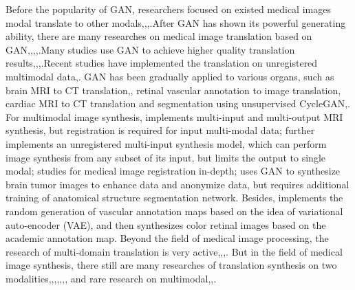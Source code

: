 \documentclass[letterpaper]{article} %
\begin{document}
Before the popularity of GAN, researchers focused on existed medical images modal translate to other modals\cite{22burgos2015robust},\cite{33huang2017simultaneous},\cite{34vemulapalli2015unsupervised},\cite{36vannguyen2015crossdomain}.After GAN has shown its powerful generating ability, there are many researches on medical image translation based on GAN\cite{2zhang2018translating},\cite{20nie2017medical},\cite{35osokin2017gans},\cite{36vannguyen2015crossdomain},\cite{40kamnitsas2017unsupervised}.Many studies use GAN to achieve higher quality translation results\cite{1zhao2018modular},\cite{5liang2018generative},\cite{6zhu2017unpaired},\cite{13choi2018stargan:}.Recent studies have implemented the translation on unregistered multimodal data\cite{2zhang2018translating},\cite{85joyce2017robust}.
GAN has been gradually applied to various organs, such as brain MRI to CT translation\cite{20nie2017medical},\cite{40kamnitsas2017unsupervised}, retinal vascular annotation to image translation\cite{41costa2017towards}, cardiac MRI to CT translation and segmentation using unsupervised CycleGAN\cite{6zhu2017unpaired},\cite{20nie2017medical}.
For multimodal image synthesis, \cite{84chartsias2018multimodal} implements multi-input and multi-output MRI synthesis, but registration is required for input multi-modal data; \cite{85Joyce2017robust} further implements an unregistered multi-input synthesis model, which can perform image synthesis from any subset of its input, but limits the output to single modal;\cite{66Miao2018dilated} studies for medical image registration in-depth;\cite{4shin2018medical} uses GAN to synthesize brain tumor images to enhance data and anonymize data, but requires additional training of anatomical structure segmentation network.
Besides,\cite{41costa2017towards} implements the random generation of vascular annotation maps based on the idea of variational  auto-encoder (VAE)\cite{87kingma2014auto-encoding}, and then synthesizes color retinal images based on the academic annotation map.
Beyond the field of medical image processing, the research of multi-domain translation is very active\cite{1zhao2018modular},\cite{5liang2018generative},\cite{13choi2018stargan:},\cite{27isola2017image-to-image}.
But in the field of medical image synthesis, there still are many researches of translation synthesis on two modalities\cite{2zhang2018translating},\cite{20nie2017medical},\cite{22burgos2015robust},\cite{34vemulapalli2015unsupervised},\cite{35osokin2017gans},\cite{36vannguyen2015crossdomain},\cite{40kamnitsas2017unsupervised}, and rare research on multimodal\cite{84chartsias2018multimodal},\cite{85joyce2017robust},\cite{4shin2018medical}.
\end{document}
